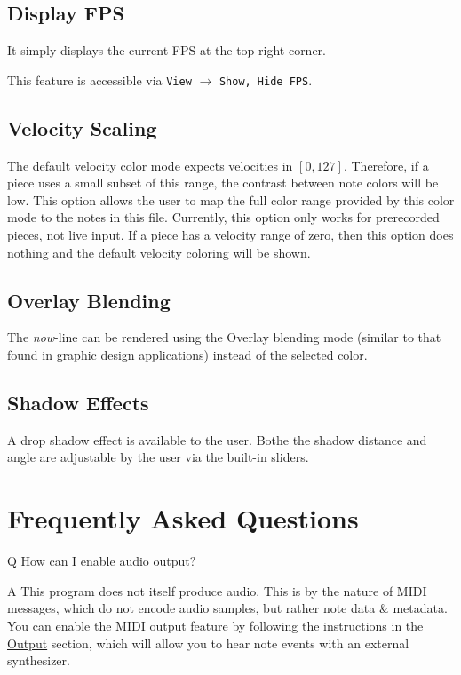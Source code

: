 \documentclass[english]{article}
\newcommand\faqQ[1]{%
  \leavevmode\par
  \noindent
{\hspace{4pt}\Large Q} \raisebox{0.1em}{\textendash{}} {\large #1}\par \vspace{-0.5em}}
\newcommand\faqA[2][]{%
  \leavevmode\par\noindent
  {\leftskip30pt
  {\large A} \raisebox{0.05em}{\textendash{}} \textbf{#1}#2\par \vspace{-0.25em}}}
\providecommand{\mi}[1]{\texttt{#1}}
\begin{document}
\vspace{1em}

\subsection{Display FPS}

It simply displays the current FPS at the top right corner.

This feature is accessible via 
\mi{View} $\rightarrow$ \mi{{Show, Hide} FPS}.

\subsection{Velocity Scaling}

The default velocity color mode expects velocities in $[0, 127]$. Therefore, if a piece uses a small subset of this range,
the contrast between note colors will be low. This option allows the user to map the full color range provided by this
color mode to the notes in this file. Currently, this option only works for prerecorded pieces, not live input.
If a piece has a velocity range of zero, then this option does nothing and the default velocity coloring will
be shown.

\subsection{Overlay Blending}

The \textit{now}-line can be rendered using the Overlay blending mode (similar to that found in graphic design applications) instead of the selected color.

\subsection{Shadow Effects}

A drop shadow effect is available to the user. Bothe the shadow
distance and angle are adjustable by the user via the built-in sliders.

\section{Frequently Asked Questions}

\faqQ{How can I enable audio output?}

\faqA{This program does not itself produce audio. This is by the nature of MIDI messages, which do not encode audio samples,
but rather note data \& metadata. You can enable the MIDI output feature by following the instructions in the 
\textcolor{lcol}{\hyperref[subsec:output]{Output}} section, which will allow you to hear note events with an external
synthesizer.}
\end{document}
